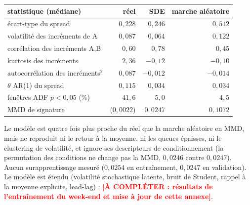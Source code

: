 \documentclass[11pt,a4paper]{article}
\theoremstyle{remark}
\newcommand{\acompleter}[1]{\textcolor{red}{\textbf{[À COMPLÉTER : #1]}}}
\begin{document}
\begin{center}
\small
\begin{tabular}{lrrr}
\toprule
statistique (médiane) & réel & SDE & marche aléatoire\\
\midrule
écart-type du spread & $0{,}228$ & $0{,}246$ & $0{,}512$\\
volatilité des incréments de A & $0{,}087$ & $0{,}064$ & $0{,}122$\\
corrélation des incréments A,B & $0{,}60$ & $0{,}78$ & $0{,}45$\\
kurtosis des incréments & $2{,}36$ & $-0{,}12$ & $-0{,}10$\\
autocorrélation des incréments$^2$ & $0{,}087$ & $-0{,}012$ & $-0{,}014$\\
$\theta$ AR(1) du spread & $0{,}115$ & $0{,}034$ & $0{,}034$\\
fenêtres ADF $p<0{,}05$ (\%) & $41{,}6$ & $5{,}0$ & $4{,}5$\\
MMD de signature & ($0{,}0022$) & $0{,}0247$ & $0{,}1072$\\
\bottomrule
\end{tabular}
\end{center}

Le modèle est quatre fois plus proche du réel que la marche aléatoire en MMD, mais ne reproduit ni le retour à la moyenne, ni les queues épaisses, ni le clustering de volatilité, et ignore ses descripteurs de conditionnement (la permutation des conditions ne change pas la MMD, $0{,}0246$ contre $0{,}0247$).
Aucun surapprentissage mesuré ($0{,}0254$ en entraînement, $0{,}0247$ en validation). Le modèle est étendu (volatilité stochastique latente, bruit de Student, rappel à la moyenne explicite, lead-lag) ; \acompleter{résultats de l'entraînement du week-end et mise à jour de cette annexe}.
\end{document}
